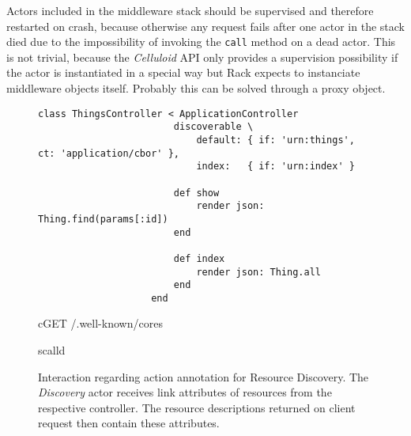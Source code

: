 			Actors included in the middleware stack should be supervised and
			therefore restarted on crash, because otherwise any request fails
			after one actor in the stack died due to the impossibility of
			invoking the \texttt{call} method on a dead actor. This is not
			trivial, because the \emph{Celluloid} \ac{API} only provides a
			supervision possibility if the actor is instantiated in a special
			way but Rack expects to instanciate middleware objects itself.
			Probably this can be solved through a proxy object.

			
			\begin{figure}
				\begin{lstlisting}[gobble=8,caption={Action annotation for Resource Discovery},label={lst:discovery:annotation}]
					class ThingsController < ApplicationController
						discoverable \
							default: { if: 'urn:things', ct: 'application/cbor' },
							index:   { if: 'urn:index' }

						def show
							render json: Thing.find(params[:id])
						end

						def index
							render json: Thing.all
						end
					end
				\end{lstlisting}
			\end{figure}

			\begin{figure}
				\begin{center}
						\begin{sequencediagram}


							\begin{messcall}{c}{GET /.well-known/core}{s}
								\begin{call}{s}{call}{d}{}
								\end{call}

							\end{messcall}
						\end{sequencediagram}
				\end{center}
				\caption[Interaction regarding action annotation for Resource
					Discovery]{Interaction regarding action annotation for
					Resource Discovery. The \emph{Discovery} actor receives
					link attributes of resources from the respective
					controller. The resource descriptions returned on client
					request then contain these attributes.}
				\label{img:discovery:annotation}
			\end{figure}

